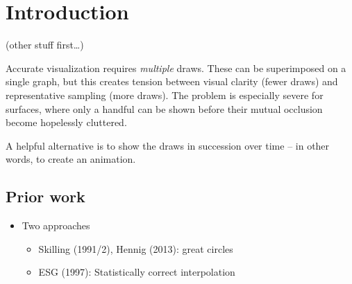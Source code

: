 \section{Introduction}
\label{sec:introduction}

(other stuff first\ldots)

Accurate visualization requires \textit{multiple} draws.
These can be superimposed on a single graph, but this creates tension between
visual clarity (fewer draws) and representative sampling (more draws).
The problem is especially severe for surfaces, where only a handful can be
shown before their mutual occlusion become hopelessly cluttered.

A helpful alternative is to show the draws in succession over time -- in other
words, to create an animation.

\subsection{Prior work}
\label{sub:prior_work}

\begin{itemize}
  \item Two approaches
  \begin{itemize}
    \item Skilling (1991/2), Hennig (2013): great circles
    \item ESG (1997): Statistically correct interpolation
  \end{itemize}
\end{itemize}
